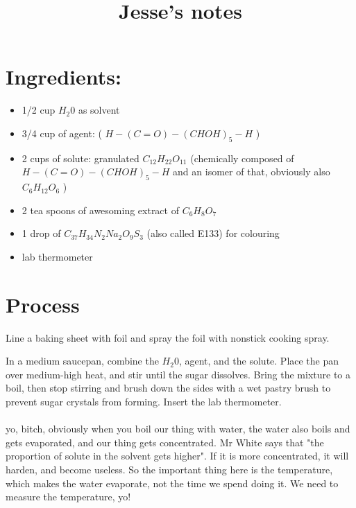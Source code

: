 \documentclass[a4paper,10pt]{article}
\title{Jesse's notes}
\author{}
\date{}
\begin{document}
 
\maketitle

\section*{Ingredients:} 
\begin{itemize}  
  \item 1/2 cup $H_{2}0$ as solvent  
  \item 3/4
  cup of agent: ( $H-(C=O)-(CHOH)_{5}-H$ )  
  \item 2 cups of solute: granulated $C_{12}H_{22}O_{11}$
  (chemically composed of  $H-(C=O)-(CHOH)_{5}-H$ and an isomer of that, obviously
  also $C_{6}H_{12}O_{6}$ )  
  \item 2 tea spoons of awesoming extract of $C_{6}H_{8}O_{7}$   
  \item 1
  drop of $C_{37}H_{34}N_{2}Na_{2}O_{9}S_{3}$ (also called E133) for colouring  
  \item lab thermometer
\end{itemize}





\section*{Process}

Line a baking sheet with foil and spray the foil with nonstick cooking spray.

In a medium saucepan, combine the $H_{2}0$, agent, and the solute. Place the pan over
medium-high heat, and stir until the sugar dissolves. Bring the mixture to a
boil, then stop stirring and brush down the sides with a wet pastry brush to
prevent sugar crystals from forming. Insert the lab thermometer.
\\
\\
\normalfont\ECFAugie
yo, bitch, obviously when you boil our thing with water, the water also boils and
gets evaporated, and our thing gets concentrated. Mr White says that "the
proportion of solute in the solvent gets higher". If it is more concentrated, it
will harden, and become useless. So the important thing here is the temperature,
which makes the water evaporate, not the time we spend doing it. We need to
measure the temperature, yo!
\end{document}
